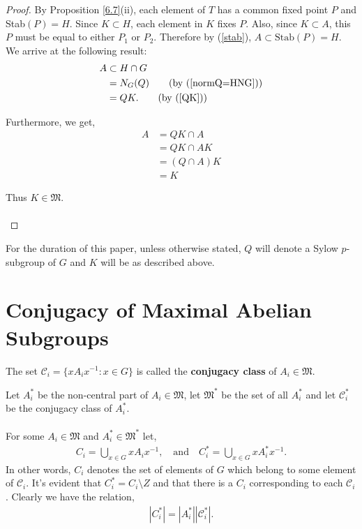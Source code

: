 \begin{proof}
By Proposition \ref{6.7}(ii), each element of $T$ has a common fixed point $P$ and Stab$(P) = H$. Since $K \subset H$, each element in $K$ fixes $P$. Also, since $K \subset A$, this $P$ must be equal to either $P_1$ or $P_2$. Therefore by (\ref{stab}), $A \subset \text{Stab}(P) = H$. We arrive at the following result:
\begin{align*} A &\subset H \cap G 
\\ &= N_G(Q) \tag{by (\ref{normQ=HNG})}
\\ &= QK. \tag{by (\ref{QK})}
\end {align*}

Furthermore, we get,
\begin{align*} A &= QK \cap A
\\ &= QK \cap AK \tag{$K \subset A$ so $A = AK$}
\\ &= (Q \cap A)K
\\ &= K \tag{$Q \cap A = I_G$}
\end{align*}

Thus $K \in \mathfrak{M}$. \\
\\
\end{proof}

For the duration of this paper, unless otherwise stated, $Q$ will denote a Sylow $p$-subgroup of $G$ and $K$ will be as described above. 


\section{Conjugacy of Maximal Abelian Subgroups}

\begin{definition} The set $\mathcal{C}_i = \{ x A_i x^{-1} : x \in G \}$ is called the \textbf{conjugacy class} of $A_i \in \mathfrak{M}$.
\end{definition}

\begin{notation-non} Let $A_i^*$ be the non-central part of $A_i \in \mathfrak{M}$, let $\mathfrak{M}^*$ be the set of all $A_i^*$ and let $\mathcal{C}_i^*$ be the conjugacy class of $A_i^*$. \\
\\
For some $A_i \in \mathfrak{M}$ and $A_i^* \in \mathfrak{M}^*$ let,
\begin{align*} C_i = \bigcup\limits_{x \in G} x A_i x^{-1}, \quad \text{and} \quad  C_i^* = \bigcup\limits_{x \in G} x A_i^* x^{-1}.
\end{align*}
In other words, $C_i$ denotes the set of elements of $G$ which belong to some element of $\mathcal{C}_i$. It's evident that $C_i^* = C_i \setminus Z$ and that there is a $C_i$ corresponding to each $\mathcal{C}_i$. Clearly we have the relation,
\begin{align}\label{orderorder} |C_i^*| = |A_i^*||\mathcal{C}_i^*|.
\end{align}
\end{notation-non}

